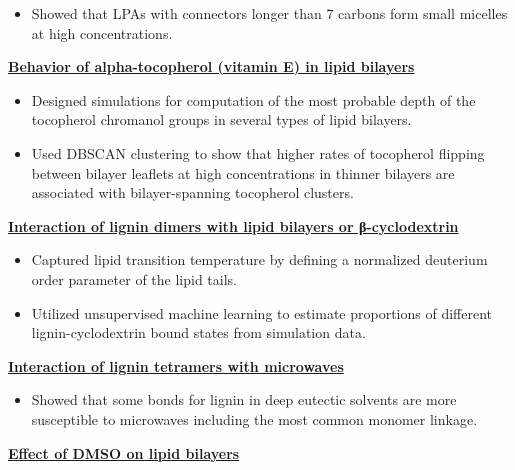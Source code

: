 \begin{cventries}
{\begin{cvitems}
\begin{itemize}
                \item {Showed that LPAs with connectors longer than 7 carbons form small micelles at high concentrations.}
                \end{itemize}
            \item {\textbf{\underline{Behavior of alpha-tocopherol (vitamin E) in lipid bilayers}}}
                \vspace{2pt}
                \begin{itemize}
                \item {Designed simulations for computation of the most probable depth of the tocopherol chromanol groups in several types of lipid bilayers.}
                \item {Used DBSCAN clustering to show that higher rates of tocopherol flipping between bilayer leaflets at high concentrations in thinner bilayers are associated with bilayer-spanning tocopherol clusters.}
                \end{itemize}
            \item {\textbf{\underline{Interaction of lignin dimers with lipid bilayers or β-cyclodextrin}}}
                \vspace{2pt}
                \begin{itemize}
                    \item {Captured lipid transition temperature by defining a normalized deuterium order parameter of the lipid tails.}
                    \item {Utilized unsupervised machine learning to estimate proportions of different lignin-cyclodextrin bound states from simulation data.}
                \end{itemize}            
            \item {\textbf{\underline{Interaction of lignin tetramers with microwaves}}}
                \vspace{2pt}
                \begin{itemize}
                    \item {Showed that some bonds for lignin in deep eutectic solvents are more susceptible to microwaves including the most common monomer linkage.}
                \end{itemize}   
            \item {\textbf{\underline{Effect of DMSO on lipid bilayers}}}

\end{cvitems}}
\end{cventries}
